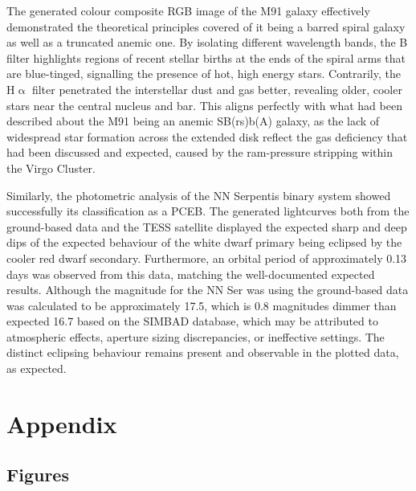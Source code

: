 \documentclass[11pt, a4paper, twocolumn]{article}
\begin{document}
The generated colour composite RGB image of the M91 galaxy effectively demonstrated the theoretical principles covered of it being a barred spiral galaxy as well as a truncated anemic one. By isolating different wavelength bands, the B filter highlights regions of recent stellar births at the ends of the spiral arms that are blue-tinged, signalling the presence of hot, high energy stars. Contrarily, the H$\upalpha$ filter penetrated the interstellar dust and gas better, revealing older, cooler stars near the central nucleus and bar. This aligns perfectly with what had been described about the M91 being an anemic SB(rs)b(A) galaxy, as the lack of widespread star formation across the extended disk reflect the gas deficiency that had been discussed and expected, caused by the ram-pressure stripping within the Virgo Cluster.

Similarly, the photometric analysis of the NN Serpentis binary system showed successfully its classification as a PCEB. The generated lightcurves both from the ground-based data and the TESS satellite displayed the expected sharp and deep dips of the expected behaviour of the white dwarf primary being eclipsed by the cooler red dwarf secondary. Furthermore, an orbital period of approximately 0.13 days was observed from this data, matching the well-documented expected results. Although the magnitude for the NN Ser was using the ground-based data was calculated to be approximately 17.5, which is 0.8 magnitudes dimmer than expected 16.7 based on the SIMBAD database, which may be attributed to atmospheric effects, aperture sizing discrepancies, or ineffective settings. The distinct eclipsing behaviour remains present and observable in the plotted data, as expected.


\onecolumn


 \label{sec:ref}

\newpage

\section*{Appendix} \label{sec:A}

\subsection*{Figures}
\end{document}
